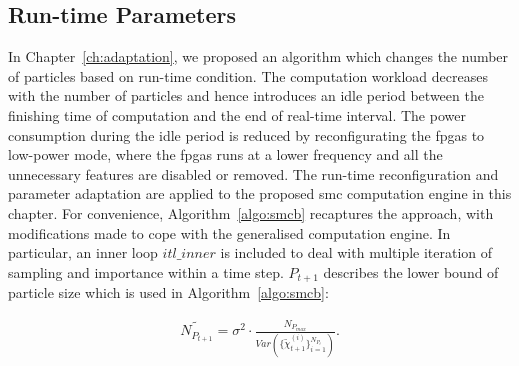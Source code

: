 \subsection{Run-time Parameters}

In Chapter~\ref{ch:adaptation}, we proposed an algorithm which changes the number of particles based on run-time condition.
The computation workload decreases with the number of particles and hence introduces an idle period between the finishing time of computation and the end of real-time interval.
The power consumption during the idle period is reduced by reconfigurating the \glspl{fpga} to low-power mode, where the \glspl{fpga} runs at a lower frequency and all the unnecessary features are disabled or removed.
The run-time reconfiguration and parameter adaptation are applied to the proposed \gls{smc} computation engine in this chapter.
For convenience, Algorithm~\ref{algo:smcb} recaptures the approach, with modifications made to cope with the generalised computation engine.
In particular, an inner loop $itl\_inner$ is included to deal with multiple iteration of sampling and importance within a time step.
$P_{t+1}$ describes the lower bound of particle size which is used in Algorithm~\ref{algo:smcb}:

\begin{equation}
\begin{aligned}
\widetilde{N_{P_{t+1}}} = \sigma^2 \cdot \frac{{N_{P_{max}}}}{Var(\{\widetilde{\chi}_{t+1}^{(i)}\}^{{N_{P_t}}}_{i=1})} \mbox{.}
\end{aligned}
\label{eqt:bound2b_ch5}
\end{equation}

